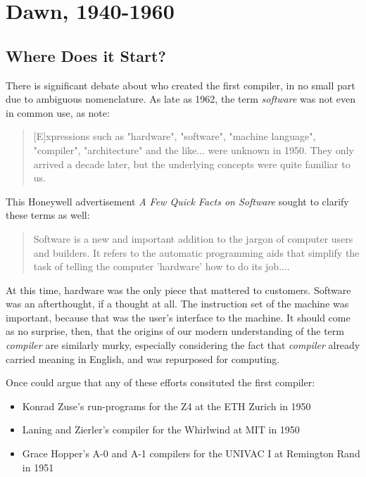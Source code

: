 \chapter{Dawn, 1940-1960}

\section{Where Does it Start?}

There is significant debate about who created the first compiler,
in no small part due to ambiguous nomenclature.
As late as 1962, the term \textit{software} was not even in common use,
as \citeauthor{the_first_computers_2002} note:

\begin{quotation}
[E]xpressions such as "hardware", "software", "machine language", "compiler",
"architecture" and the like... were unknown in 1950. They only arrived a decade
later, but the underlying concepts were quite familiar to us.
\cite{the_first_computers_2002}
\end{quotation}

This Honeywell advertisement \textit{A Few Quick Facts on Software} sought to clarify these terms as well:

\begin{quotation}
Software is a new and important addition to the jargon of computer users and builders.
It refers to the automatic programming aids that simplify the task of telling the computer 'hardware' how to do its job....
\end{quotation}

At this time, hardware was the only piece that mattered to customers.
Software was an afterthought, if a thought at all.
The instruction set of the machine was important, because that was the
user's interface to the machine.
It should come as no surprise, then, that the origins of our modern understanding of the
term \textit{compiler} are similarly murky, especially considering the fact that
\textit{compiler} already carried meaning in English, and was repurposed for computing.

\bigskip

Once could argue that any of these efforts consituted the first compiler:
\begin{itemize}
    \item Konrad Zuse's run-programs for the Z4 at the ETH Zurich in 1950
    \item Laning and Zierler's compiler for the Whirlwind at MIT in 1950
    \item Grace Hopper's A-0 and A-1 compilers for the UNIVAC I at Remington Rand in 1951
\end{itemize}

